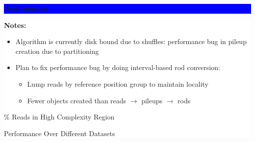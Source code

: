 \documentclass[11pt]{a0poster}
\begin{document}
{\begin{minipage}[t][2045pt][t]{\linewidth}
\begin{minipage}{0.6\linewidth}
\vspace{70pt}
\colorbox{Blue}{
\begin{minipage}[t]{\linewidth}
\vspace{30pt}
\begin{center}
\Huge \bf \color{White} Performance
\end{center}
\vspace{17pt}
\end{minipage}
}
\colorbox{White}{
\begin{minipage}[t][800pt][t]{\linewidth}
\begin{minipage}{0.3\linewidth}
\LARGE
\color{Blue}
\textbf{Notes:}
\begin{itemize}
\item Algorithm is currently disk bound due to shuffles:
performance bug in pileup creation due to partitioning
\item Plan to fix performance bug by doing interval-based rod conversion: 
\Large
\begin{itemize}
\item Lump reads by reference position group to maintain locality
\item Fewer objects created than reads $\to$ pileups $\to$ rods
\end{itemize}
\end{itemize}
\end{minipage}
\begin{minipage}{0.03\linewidth}
\hfill
\pagebreak
\end{minipage}
\begin{minipage}{0.3\linewidth}
\end{minipage}
\begin{minipage}{0.03\linewidth}
\hfill
\pagebreak
\end{minipage}
\begin{minipage}{0.3\linewidth}
\color{Blue}
\begin{center}
\% Reads in High Complexity Region
\end{center}
\color{Blue}
\begin{center}
Performance Over Different Datasets
\end{center}
\end{minipage}
\pagebreak
\end{minipage}
}


\end{minipage}
\end{minipage}}
\end{document}
